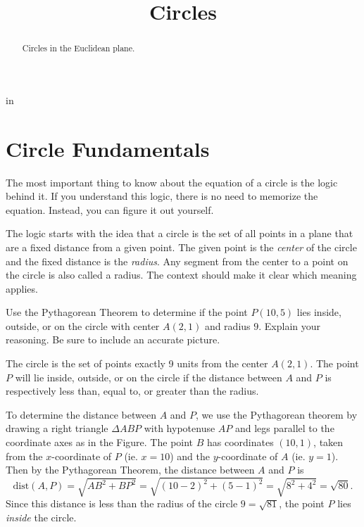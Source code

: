 \documentclass{ximera}
\title{Circles}
\newcommand{\pskip}{\vskip 0.1 in}
\begin{document}
\begin{abstract}
Circles in the Euclidean plane.
\end{abstract}
\maketitle


\pskip

\section{Circle Fundamentals}

The most important thing to know about the equation of a circle is the logic behind it. If you understand this logic, there is no need to memorize the equation. Instead, you can figure it out yourself.

The logic starts with the idea that a circle is the set of all points in a plane that are a fixed distance from a given point. The given point is the \emph{center} of the circle and the fixed distance is the \emph{radius}. Any segment from the center to a point on the circle is also called a radius. The context should make it clear which meaning applies.




\begin{example} \label{Ex1}
Use the Pythagorean Theorem to determine if the point $P(10,5)$ lies inside, outside, or on the circle with center $A(2,1)$ and radius $9$. Explain your reasoning. Be sure to include an accurate picture.
\end{example}

\begin{explanation}
The circle is the set of points exactly 9 units from the center $A(2,1)$. The point $P$ will lie inside, outside, or on the circle if the distance between $A$ and $P$ is respectively less than, equal to, or greater than the radius.

To determine the distance between $A$ and $P$, we use the Pythagorean theorem by drawing a right triangle $\Delta ABP$ with hypotenuse $AP$ and legs parallel to the coordinate axes as in the Figure. The point $B$ has coordinates $(10,1)$, taken from the $x$-coordinate of $P$ (ie. $x=10$) and the $y$-coordinate of $A$ (ie. $y=1$). Then by the Pythagorean Theorem, the distance between $A$ and $P$ is
\[
   \text{dist}(A,P) = \sqrt{AB^2 + BP^2} = \sqrt{(10-2)^2 + (5-1)^2} = \sqrt{8^2 + 4^2} = \sqrt{80} . 
\]
Since this distance is less than the radius of the circle $9 = \sqrt{81}$, the point $P$ lies \emph{inside} the circle.

\iffalse   %

\begin{figure}[!h]
\centerline{
\texttt{[image: Circle1.eps]}   
}
\end{figure}

\fi   %


\end{explanation}
\end{document}
